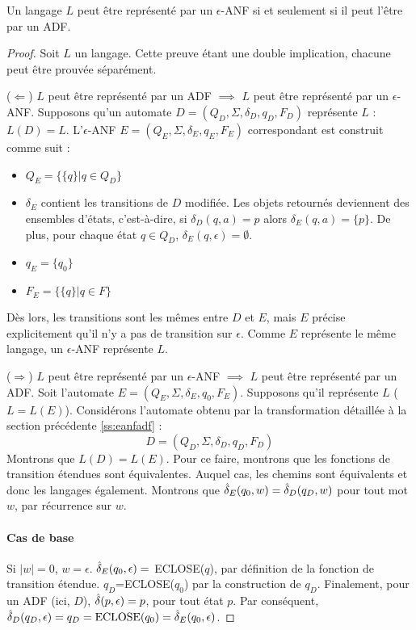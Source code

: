 \begin{theorem}
	Un langage $L$ peut être représenté par un $\epsilon$-ANF si et seulement si il peut l'être par un ADF.
\end{theorem}

\begin{proof}
	 Soit $L$ un langage. Cette preuve étant une double implication, chacune peut être prouvée séparément.
	
	($\Leftarrow$) $L$ peut être représenté par un ADF $\implies$ $L$ peut être représenté par un $\epsilon$-ANF. Supposons qu'un automate $D=(Q_D, \Sigma, \delta_D, q_D, F_D)$ représente $L$ : $L(D)=L$. 
	L'$\epsilon$-ANF $E=(Q_E, \Sigma, \delta_E, q_E, F_E)$ correspondant est construit comme suit :
	
	\begin{itemize}
		\item $Q_E=\{\{q\}|q\in Q_D\}$
		\item $\delta_E$ contient les transitions de $D$ modifiée. Les objets retournés deviennent des ensembles d'états, c'est-à-dire, si $\delta_D(q,a)=p$ alors $\delta_E(q,a)=\{p\}$. De plus, pour chaque état $q\in Q_D$, $\delta_E(q,\epsilon)=\emptyset$. 
		\item $q_E=\{q_0\}$
		\item $F_E=\{\{q\}| q\in F\}$
	\end{itemize}
	 
	 Dès lors, les transitions sont les mêmes entre $D$ et $E$, mais $E$ précise explicitement qu'il n'y a pas de transition sur $\epsilon$. Comme $E$ représente le même langage, un $\epsilon$-ANF représente $L$.
	
	
	($\Rightarrow$) $L$ peut être représenté par un $\epsilon$-ANF $\implies$ $L$ peut être représenté par un ADF. Soit l'automate $E=(Q_E, \Sigma, \delta_E, q_0, F_E)$. Supposons qu'il représente $L$ ($L=L(E)$). Considérons l'automate obtenu par la transformation détaillée à la section précédente \ref{ss:eanfadf} :
	$$
	D=(Q_D, \Sigma, \delta_D, q_D, F_D)
	$$
	Montrons que $L(D)=L(E)$. Pour ce faire, montrons que les fonctions de transition étendues sont équivalentes. Auquel cas, les chemins sont équivalents et donc les langages également.
	Montrons que $\hat{\delta}_E(q_0,w)=\hat{\delta}_D(q_D,w)$ pour tout mot $w$, par récurrence sur $w$.
	
	\paragraph{Cas de base} Si $|w|=0$, $w=\epsilon$. $\hat{\delta}_E(q_0,\epsilon)=$ ECLOSE($q$), par définition de la fonction de transition étendue. $q_D$=ECLOSE($q_0$) par la construction de $q_D$. Finalement, pour un ADF (ici, $D$), $\hat{\delta}(p,\epsilon)=p$, pour tout état $p$. Par conséquent, $\hat{\delta}_D(q_D,\epsilon)=q_D=\text{ECLOSE(}q_0\text{)}=\hat{\delta}_E(q_0,\epsilon)$.
	

\end{proof}
